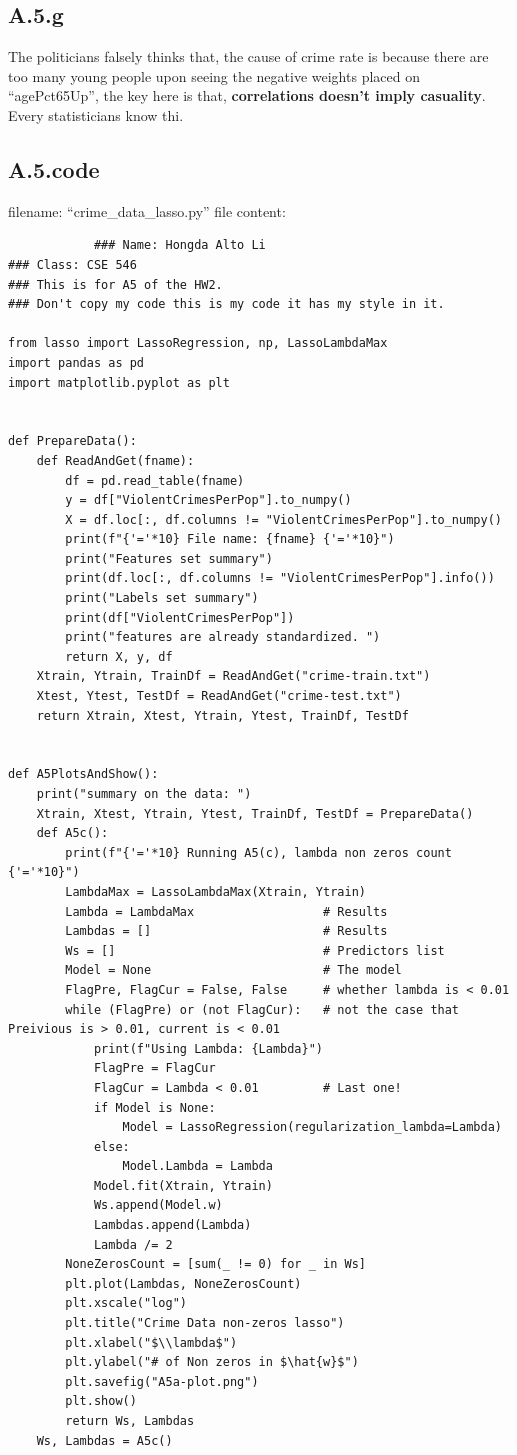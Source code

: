 \documentclass[]{article}
\begin{document}
    \subsection*{A.5.g}
        The politicians falsely thinks that, the cause of crime rate is because there are too many young people upon seeing the negative weights placed on ``agePct65Up'', the key here is that, \textbf{correlations doesn't imply casuality}. Every statisticians know thi. 
    \subsection*{A.5.code}
        filename: ``crime_data_lasso.py''
        file content: 
        \begin{lstlisting}
            ### Name: Hongda Alto Li
### Class: CSE 546
### This is for A5 of the HW2.
### Don't copy my code this is my code it has my style in it.

from lasso import LassoRegression, np, LassoLambdaMax
import pandas as pd
import matplotlib.pyplot as plt


def PrepareData():
    def ReadAndGet(fname):
        df = pd.read_table(fname)
        y = df["ViolentCrimesPerPop"].to_numpy()
        X = df.loc[:, df.columns != "ViolentCrimesPerPop"].to_numpy()
        print(f"{'='*10} File name: {fname} {'='*10}")
        print("Features set summary")
        print(df.loc[:, df.columns != "ViolentCrimesPerPop"].info())
        print("Labels set summary")
        print(df["ViolentCrimesPerPop"])
        print("features are already standardized. ")
        return X, y, df
    Xtrain, Ytrain, TrainDf = ReadAndGet("crime-train.txt")
    Xtest, Ytest, TestDf = ReadAndGet("crime-test.txt")
    return Xtrain, Xtest, Ytrain, Ytest, TrainDf, TestDf


def A5PlotsAndShow():
    print("summary on the data: ")
    Xtrain, Xtest, Ytrain, Ytest, TrainDf, TestDf = PrepareData()
    def A5c():
        print(f"{'='*10} Running A5(c), lambda non zeros count {'='*10}")
        LambdaMax = LassoLambdaMax(Xtrain, Ytrain)
        Lambda = LambdaMax                  # Results
        Lambdas = []                        # Results
        Ws = []                             # Predictors list
        Model = None                        # The model
        FlagPre, FlagCur = False, False     # whether lambda is < 0.01
        while (FlagPre) or (not FlagCur):   # not the case that Preivious is > 0.01, current is < 0.01
            print(f"Using Lambda: {Lambda}")
            FlagPre = FlagCur
            FlagCur = Lambda < 0.01         # Last one!
            if Model is None:
                Model = LassoRegression(regularization_lambda=Lambda)
            else:
                Model.Lambda = Lambda
            Model.fit(Xtrain, Ytrain)
            Ws.append(Model.w)
            Lambdas.append(Lambda)
            Lambda /= 2
        NoneZerosCount = [sum(_ != 0) for _ in Ws]
        plt.plot(Lambdas, NoneZerosCount)
        plt.xscale("log")
        plt.title("Crime Data non-zeros lasso")
        plt.xlabel("$\\lambda$")
        plt.ylabel("# of Non zeros in $\hat{w}$")
        plt.savefig("A5a-plot.png")
        plt.show()
        return Ws, Lambdas
    Ws, Lambdas = A5c()


\end{lstlisting}
\end{document}
